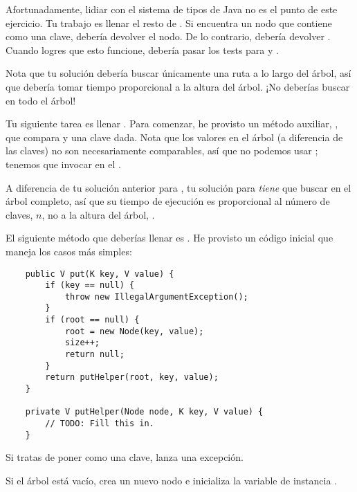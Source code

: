 \documentclass[12pt]{book}
\theoremstyle{exercise}
\begin{document}

Afortunadamente, lidiar con el sistema de tipos de Java no es el punto de
este ejercicio. Tu trabajo es llenar el resto de . Si
encuentra un nodo que contiene  como una clave, debería devolver
el nodo. De lo contrario, debería devolver . Cuando logres que esto
funcione, debería pasar los tests para  y .

Nota que tu solución debería buscar únicamente una ruta a lo largo del árbol,
así que debería tomar tiempo proporcional a la altura del árbol.  ¡No deberías
buscar en todo el árbol!


Tu siguiente tarea es llenar . Para comenzar,
he provisto un método auxiliar, , que compara
 y una clave dada. Nota que los valores en el árbol (a
diferencia de las claves) no son necesariamente comparables, así que
no podemos usar ; tenemos que invocar 
en el .


A diferencia de tu solución anterior para , tu solución para
 \emph{tiene} que buscar en el árbol completo, así que
su tiempo de ejecución es proporcional al número de claves, $n$, no a la
altura del árbol, .

El siguiente método que deberías llenar es . He provisto
  un código inicial que maneja los casos más simples:

\begin{verbatim}
    public V put(K key, V value) {
        if (key == null) {
            throw new IllegalArgumentException();
        }
        if (root == null) {
            root = new Node(key, value);
            size++;
            return null;
        }
        return putHelper(root, key, value);
    }

    private V putHelper(Node node, K key, V value) {
        // TODO: Fill this in.
    }
\end{verbatim}

Si tratas de poner  como una clave,  lanza una
excepción.

Si el árbol está vacío,  crea un nuevo nodo e inicializa
la variable de instancia .

\end{document}
